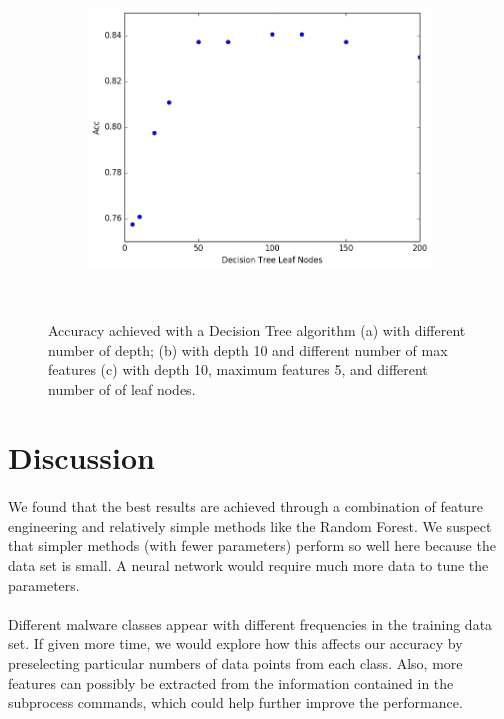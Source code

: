 \documentclass[11pt]{article}
\begin{document}
\begin{figure}[]
\begin{subfigure}[!t]{0.3\textwidth}
        \includegraphics[width=\textwidth]{Plots/DT_leafnodes.png}
    \end{subfigure}\\
        \caption{Accuracy achieved with a Decision Tree algorithm (a) with different number of depth; (b) with depth 10 and different number of max features (c)  with depth 10, maximum features 5, and different number of of leaf nodes.}
            \label{fig:DT}
\end{figure}

\section{Discussion} 
\paragraph{}We found that the best results are achieved through a combination of feature engineering and relatively simple methods like the Random Forest. We suspect that simpler methods (with fewer parameters) perform so well here because the data set is small. A neural network would require much more data to tune the parameters.
\paragraph{}Different malware classes appear with different frequencies in the training data set. If given more time, we would explore how this affects our accuracy by preselecting particular numbers of data points from each class. Also, more features can possibly be extracted from the information contained in the subprocess commands, which could help further improve the performance. 
\end{document}

